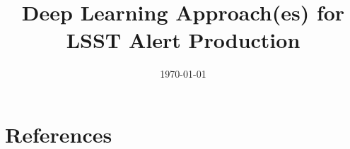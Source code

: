 \documentclass[modern]{aastex62}
\begin{document}

\date{\today}
\title{Deep Learning Approach(es) for LSST Alert Production}





\section{References} \label{sec:bib}

% 

% 
\end{document}
